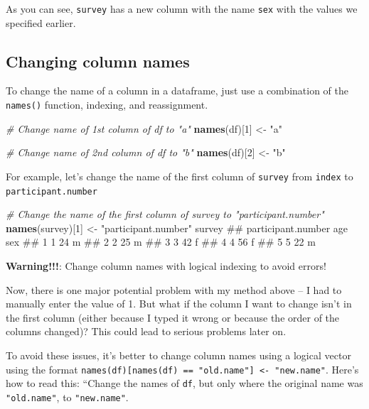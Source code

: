 \documentclass[]{book}
\newenvironment{Shaded}{\begin{snugshade}}{\end{snugshade}}
\newcommand{\KeywordTok}[1]{\textcolor[rgb]{0.13,0.29,0.53}{\textbf{#1}}}
\newcommand{\DecValTok}[1]{\textcolor[rgb]{0.00,0.00,0.81}{#1}}
\newcommand{\StringTok}[1]{\textcolor[rgb]{0.31,0.60,0.02}{#1}}
\newcommand{\CommentTok}[1]{\textcolor[rgb]{0.56,0.35,0.01}{\textit{#1}}}
\newcommand{\NormalTok}[1]{#1}
\theoremstyle{definition}
\theoremstyle{definition}
\theoremstyle{remark}
\begin{document}
As you can see, \texttt{survey} has a new column with the name
\texttt{sex} with the values we specified earlier.

\subsection{Changing column names}\label{changing-column-names}

To change the name of a column in a dataframe, just use a combination of
the \texttt{names()} function, indexing, and reassignment.

\begin{Shaded}
\begin{Highlighting}[]
\CommentTok{# Change name of 1st column of df to "a"}
\KeywordTok{names}\NormalTok{(df)[}\DecValTok{1}\NormalTok{] <-}\StringTok{ "a"}

\CommentTok{# Change name of 2nd column of df to "b"}
\KeywordTok{names}\NormalTok{(df)[}\DecValTok{2}\NormalTok{] <-}\StringTok{ "b"}
\end{Highlighting}
\end{Shaded}

For example, let's change the name of the first column of
\texttt{survey} from \texttt{index} to \texttt{participant.number}

\begin{Shaded}
\begin{Highlighting}[]
\CommentTok{# Change the name of the first column of survey to "participant.number"}
\KeywordTok{names}\NormalTok{(survey)[}\DecValTok{1}\NormalTok{] <-}\StringTok{ "participant.number"}
\NormalTok{survey}
\NormalTok{##   participant.number age sex}
\NormalTok{## 1                  1  24   m}
\NormalTok{## 2                  2  25   m}
\NormalTok{## 3                  3  42   f}
\NormalTok{## 4                  4  56   f}
\NormalTok{## 5                  5  22   m}
\end{Highlighting}
\end{Shaded}

\textbf{Warning!!!}: Change column names with logical indexing to avoid
errors!

Now, there is one major potential problem with my method above -- I had
to manually enter the value of 1. But what if the column I want to
change isn't in the first column (either because I typed it wrong or
because the order of the columns changed)? This could lead to serious
problems later on.

To avoid these issues, it's better to change column names using a
logical vector using the format
\texttt{names(df){[}names(df)\ ==\ "old.name"{]}\ \textless{}-\ "new.name"}.
Here's how to read this: ``Change the names of \texttt{df}, but only
where the original name was \texttt{"old.name"}, to \texttt{"new.name"}.
\end{document}
